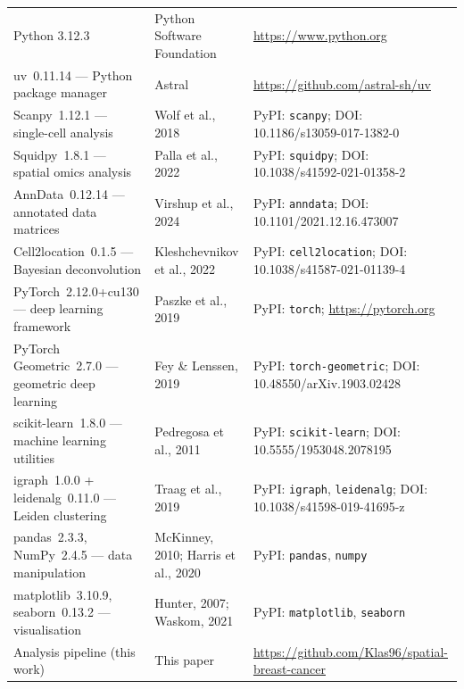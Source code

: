 \documentclass[12pt, a4paper]{article}
\begin{document}
\begin{longtable}{p{4.5cm} p{4.8cm} p{5.3cm}}
Python 3.12.3 &
Python Software Foundation &
\url{https://www.python.org} \\[4pt]

uv~0.11.14 — Python package manager &
Astral &
\url{https://github.com/astral-sh/uv} \\[4pt]

Scanpy~1.12.1 — single-cell analysis &
Wolf et al., 2018 \citep{wolf2018} &
PyPI: \texttt{scanpy};
DOI: 10.1186/s13059-017-1382-0 \\[4pt]

Squidpy~1.8.1 — spatial omics analysis &
Palla et al., 2022 \citep{palla2022} &
PyPI: \texttt{squidpy};
DOI: 10.1038/s41592-021-01358-2 \\[4pt]

AnnData~0.12.14 — annotated data matrices &
Virshup et al., 2024 &
PyPI: \texttt{anndata};
DOI: 10.1101/2021.12.16.473007 \\[4pt]

Cell2location~0.1.5 — Bayesian deconvolution &
Kleshchevnikov et al., 2022 \citep{kleshchevnikov2022} &
PyPI: \texttt{cell2location};
DOI: 10.1038/s41587-021-01139-4 \\[4pt]

PyTorch~2.12.0+cu130 — deep learning framework &
Paszke et al., 2019 &
PyPI: \texttt{torch};
\url{https://pytorch.org} \\[4pt]

PyTorch Geometric~2.7.0 — geometric deep learning &
Fey \& Lenssen, 2019 &
PyPI: \texttt{torch-geometric};
DOI: 10.48550/arXiv.1903.02428 \\[4pt]

scikit-learn~1.8.0 — machine learning utilities &
Pedregosa et al., 2011 &
PyPI: \texttt{scikit-learn};
DOI: 10.5555/1953048.2078195 \\[4pt]

igraph~1.0.0 + leidenalg~0.11.0 — Leiden clustering &
Traag et al., 2019 \citep{traag2019} &
PyPI: \texttt{igraph}, \texttt{leidenalg};
DOI: 10.1038/s41598-019-41695-z \\[4pt]

pandas~2.3.3, NumPy~2.4.5 — data manipulation &
McKinney, 2010; Harris et al., 2020 &
PyPI: \texttt{pandas}, \texttt{numpy} \\[4pt]

matplotlib~3.10.9, seaborn~0.13.2 — visualisation &
Hunter, 2007; Waskom, 2021 &
PyPI: \texttt{matplotlib}, \texttt{seaborn} \\[4pt]

Analysis pipeline (this work) &
This paper &
\url{https://github.com/Klas96/spatial-breast-cancer} \\[4pt]


\end{longtable}
\end{document}

